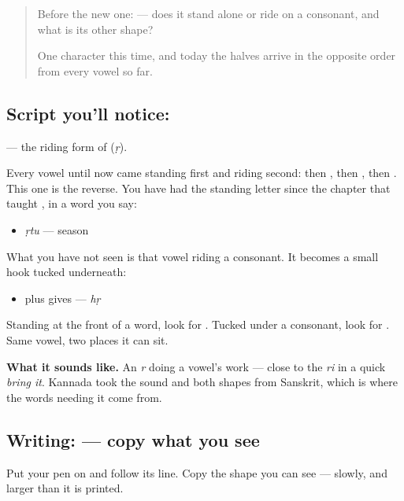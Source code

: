 \label{lesson:KA-S131-vowel-sign-vocalic-r}



\begin{quote}
Before the new one:  — does it stand alone or ride on a consonant, and what is its other shape?

One character this time, and today the halves arrive in the opposite order from every vowel so far.
\end{quote}

\subsection*{Script you'll notice: }
\textbf{} — the riding form of \textbf{} (\emph{ṛ}).

Every vowel until now came standing first and riding second: \textbf{} then \textbf{}, \textbf{} then \textbf{}, \textbf{} then \textbf{}. This one is the reverse. You have had the standing letter since the chapter that taught \textbf{}, in a word you say:

\begin{itemize}
\raggedright
  \item \textbf{} \emph{ṛtu} — season
\end{itemize}

What you have not seen is that vowel riding a consonant. It becomes a small hook tucked underneath:

\begin{itemize}
\raggedright
  \item \textbf{} plus \textbf{} gives \textbf{} — \emph{hṛ}
\end{itemize}

Standing at the front of a word, look for \textbf{}. Tucked under a consonant, look for \textbf{}. Same vowel, two places it can sit.

\textbf{What it sounds like.} An \emph{r} doing a vowel's work — close to the \emph{ri} in a quick \emph{bring it}. Kannada took the sound and both shapes from Sanskrit, which is where the words needing it come from.

\subsection*{Writing:  — copy what you see}
Put your pen on  and follow its line. Copy the shape you can see — slowly, and larger than it is printed.


